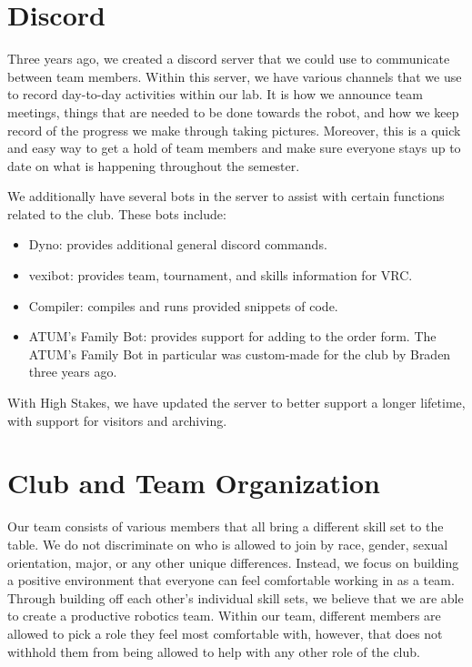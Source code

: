 \section{Discord}
Three years ago, we created a discord server that we could use to communicate between team members. Within this server, we have various channels that we use to record day-to-day activities within our lab. It is how we announce team meetings, things that are needed to be done towards the robot, and how we keep record of the progress we make through taking pictures. Moreover, this is a quick and easy way to get a hold of team
members and make sure everyone stays up to date on what is happening throughout the semester. 

We additionally have several bots in the server to assist with certain functions related to the club. These bots include:
\begin{itemize}
\item Dyno: provides additional general discord commands.
\item vexibot: provides team, tournament, and skills information for VRC.
\item Compiler: compiles and runs provided snippets of code.
\item ATUM’s Family Bot: provides support for adding to the order form. The ATUM’s Family Bot in particular was custom-made for the club by Braden three years ago.
\end{itemize}

With High Stakes, we have updated the server to better support a longer lifetime, with support for visitors and archiving. 
\newline


\section{Club and Team Organization}
Our team consists of various members that all bring a different skill set to the table. We do
not discriminate on who is allowed to join by race, gender, sexual orientation, major, or any
other unique differences. Instead, we focus on building a positive environment that everyone
can feel comfortable working in as a team. Through building off each other’s individual skill
sets, we believe that we are able to create a productive robotics team. Within our team,
different members are allowed to pick a role they feel most comfortable with, however, that
does not withhold them from being allowed to help with any other role of the club.

